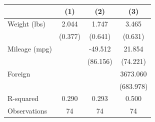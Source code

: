 \begin{tabular}{l*{3}{c}}
\doublerule
                &\multicolumn{1}{c}{(1)}         &\multicolumn{1}{c}{(2)}         &\multicolumn{1}{c}{(3)}         \\
\midrule
Weight (lbs)    &    2.044\sym{***}&    1.747\sym{***}&    3.465\sym{***}\\
                &  (0.377)         &  (0.641)         &  (0.631)         \\
\addlinespace
Mileage (mpg)   &                  &  -49.512         &   21.854         \\
                &                  & (86.156)         & (74.221)         \\
\addlinespace
Foreign         &                  &                  & 3673.060\sym{***}\\
                &                  &                  &(683.978)         \\
\midrule
R-squared       &    0.290         &    0.293         &    0.500         \\
Observations    &       74         &       74         &       74         \\
\midrule
\end{tabular}
